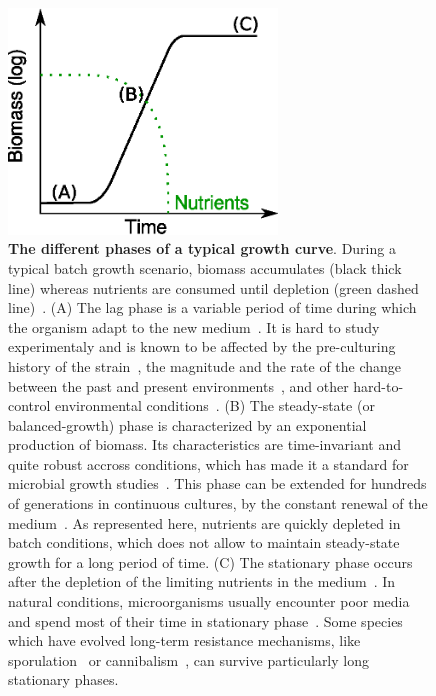 \begin{figure}[p]
\centering
\includegraphics[height=6cm]{./Fig/Chapter1/growth_curve.eps}
\caption{
\textbf{The different phases of a typical growth curve}.
During a typical batch growth scenario, biomass accumulates (black thick line) whereas nutrients are consumed until depletion (green dashed line)~\cite{schaechter_microbe_2006}.
(A) The lag phase is a variable period of time during which the organism adapt to the new medium~\cite{swinnen_predictive_2004}.
It is hard to study experimentaly and is known to be affected by the pre-culturing history of the strain~\cite{ng_damage_1962,dufrenne_effect_1997,shaw_effect_1967}, the magnitude and the rate of the change between the past and present environments~\cite{mcmeekin_predictive_2002}, and other hard-to-control environmental conditions~\cite{cheroutre-vialette_application_2002}.
(B) The steady-state (or balanced-growth) phase is characterized by an exponential production of biomass.
Its characteristics are time-invariant and quite robust accross conditions, which has made it a standard for microbial growth studies~\cite{schaechter_microbe_2006}.
This phase can be extended for hundreds of generations in continuous cultures, by the constant renewal of the medium~\cite{borirak_molecular_2014,herbert_continuous_1956,wang_robust_2010}.
As represented here, nutrients are quickly depleted in batch conditions, which does not allow to maintain steady-state growth for a long period of time.
(C) The stationary phase occurs after the depletion of the limiting nutrients in the medium~\cite{chubukov_environmental_2014,schaechter_microbe_2006}.
In natural conditions, microorganisms usually encounter poor media and spend most of their time in stationary phase~\cite{mcarthur_microbial_2006,menge_nitrogen_2012,hobbie_microbes_2013}.
Some species which have evolved long-term resistance mechanisms, like sporulation~\cite{stragier_molecular_1996} or cannibalism~\cite{gonzalez-pastor_cannibalism:_2011}, can survive particularly long stationary phases.
}
\label{fig:growth_curve}
\end{figure}

